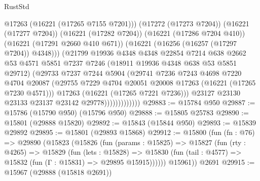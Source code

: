 \begin{lexlean}{RustStd}
\begin{coremodule}
                              @17263
                              (@16221 (@17265 @7155 @7201)))
                            (@17272 (@17273 @7204))
                            (@16221 (@17277 @7204))
                            (@16221 (@17282 @7204))
                            (@16221 (@17286 @7204 @410))
                            (@16221 (@17291 @2660 @410 @671))
                            (@16221 (@16256 (@16257 (@17297 @7204)) @4348)))
                          (@21799
                            @19936
                            @4348
                            @4348
                            @22854
                            @7214
                            @638
                            @2662
                            @53
                            @4571
                            @5851
                            @7237
                            @7246
                            (@18911 @19936 @4348 @638 @53 @5851 @29712)
                            (@29733
                              @7237
                              @7244
                              @5904
                              (@29741
                                @7236
                                @7243
                                @4698
                                @7220
                                @4704
                                @20087
                                (@29755
                                  @7229
                                  @4704
                                  @20051
                                  @20008
                                  @17263
                                  (@16221 (@17265 @7230 @4571)))
                                @17263
                                (@16221 (@17265 @7221 @7236)))
                              @23127
                              @23130
                              @23133
                              @23137
                              @23142
                              @29778)))))))))))))
@29883 := @15784 @950
@29887 := @15786 (@15790 @950) (@15796 @950)
@29888 := @15805 @25783
@29890 := @15801 (@29888 @15820)
@29892 := @15843 (@15844 @950)
@29893 := @15839 @29892
@29895 := @15801 (@29893 @15868)
@29912 := @15800
    (fun (fn : @76) =>
    @29890
      (@15823
        (@15826
          (fun (params : @15825) =>
          @15827
            (fun (rty : @4265) =>
            @15829
              (fun (lets : @15828) =>
              @15830 (fun (tail : @4577) => @15832 (fun (Γ : @15831) => @29895 @15915))))))
        @15961))
    @2691
@29915 := @15967 (@29888 (@15818 @2691))

\end{coremodule}
\end{lexlean}
